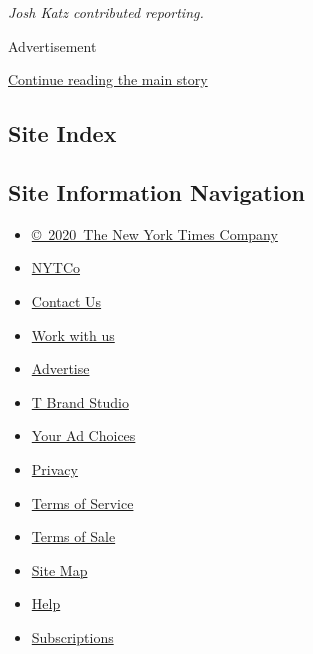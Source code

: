 \emph{Josh Katz contributed reporting.}

Advertisement

\protect\hyperlink{after-bottom}{Continue reading the main story}

\hypertarget{site-index}{%
\subsection{Site Index}\label{site-index}}

\hypertarget{site-information-navigation}{%
\subsection{Site Information
Navigation}\label{site-information-navigation}}

\begin{itemize}
\tightlist
\item
  \href{https://help.nytimes.com/hc/en-us/articles/115014792127-Copyright-notice}{©~2020~The
  New York Times Company}
\end{itemize}

\begin{itemize}
\tightlist
\item
  \href{https://www.nytco.com/}{NYTCo}
\item
  \href{https://help.nytimes.com/hc/en-us/articles/115015385887-Contact-Us}{Contact
  Us}
\item
  \href{https://www.nytco.com/careers/}{Work with us}
\item
  \href{https://nytmediakit.com/}{Advertise}
\item
  \href{http://www.tbrandstudio.com/}{T Brand Studio}
\item
  \href{https://www.nytimes.com/privacy/cookie-policy\#how-do-i-manage-trackers}{Your
  Ad Choices}
\item
  \href{https://www.nytimes.com/privacy}{Privacy}
\item
  \href{https://help.nytimes.com/hc/en-us/articles/115014893428-Terms-of-service}{Terms
  of Service}
\item
  \href{https://help.nytimes.com/hc/en-us/articles/115014893968-Terms-of-sale}{Terms
  of Sale}
\item
  \href{https://spiderbites.nytimes.com}{Site Map}
\item
  \href{https://help.nytimes.com/hc/en-us}{Help}
\item
  \href{https://www.nytimes.com/subscription?campaignId=37WXW}{Subscriptions}
\end{itemize}
